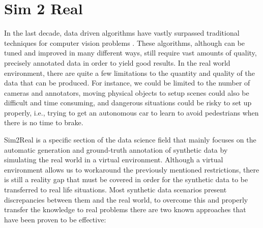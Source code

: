 \section{Sim 2 Real}
\label{sec:sim2real}
In the last decade, data driven algorithms have vastly surpassed traditional techniques for computer vision problems \citep{inbook}. These algorithms, although can be tuned and improved in many different ways, still require vast amounts of quality, precisely annotated data in order to yield good results. In the real world environment, there are quite a few limitations to the quantity and quality of the data that can be produced. For instance, we could be limited to the number of cameras and annotators, moving physical objects to setup scenes could also be difficult and time consuming, and dangerous situations could be risky to set up properly, i.e., trying to get an autonomous car to learn to avoid pedestrians when there is no time to brake.
    
Sim2Real is a specific section of the data science field that mainly focuses on the automatic generation and ground-truth annotation of synthetic data by simulating the real world in a virtual environment. Although a virtual environment allows us to workaround the previously mentioned restrictions, there is still a reality gap that must be covered in order for the synthetic data to be transferred to real life situations. Most synthetic data scenarios present discrepancies between them and the real world, to overcome this and properly transfer the knowledge to real problems there are two known approaches that have been proven to be effective: 

